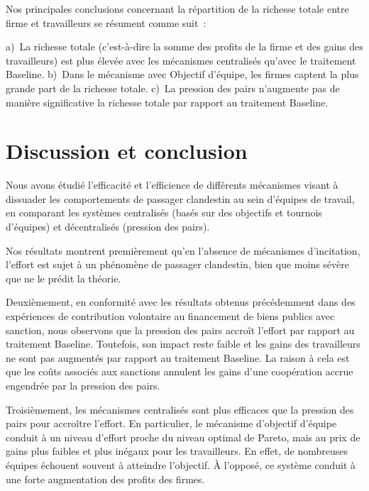\begin{Article}
\begin{refsection}[Lebourges]
Nos principales conclusions concernant la répartition de la richesse
totale entre firme et travailleurs se résument comme suit~:

\vspace{.2cm}
\begin{resultat}
a)~La richesse totale (c'est-à-dire la somme des
profits de la firme et des gains des travailleurs) est plus élevée avec
les mécanismes centralisés qu'avec le traitement Baseline. b)~Dans le
mécanisme avec Objectif d'équipe, les firmes captent la plus grande part
de la richesse totale. c)~La pression des pairs n'augmente pas de
manière significative la richesse totale par rapport au traitement
Baseline.
\end{resultat}


\section{Discussion et conclusion}
\label{section:discussion et conclusion}

Nous avons étudié l'efficacité et l'efficience de différents mécanismes
visant à dissuader les comportements de passager clandestin au sein
d'équipes de travail, en comparant les systèmes centralisés (basés sur
des objectifs et tournois d'équipes) et décentralisés (pression des
pairs).

Nos résultats montrent premièrement qu'en l'absence de mécanismes
d'incitation, l'effort est sujet à un phénomène de passager clandestin,
bien que moins sévère que ne le prédit la théorie.

Deuxièmement, en conformité avec les résultats obtenus précédemment dans
des expériences de contribution volontaire au financement de biens
publics avec sanction, nous observons que la pression des pairs accroît
l'effort par rapport au traitement Baseline. Toutefois, son impact reste
faible et les gains des travailleurs ne sont pas augmentés par rapport
au traitement Baseline. La raison à cela est que les coûts associés aux
sanctions annulent les gains d'une coopération accrue engendrée par la
pression des pairs.

Troisièmement, les mécanismes centralisés sont plus efficaces que la
pression des pairs pour accroître l'effort. En particulier, le mécanisme
d'objectif d'équipe conduit à un niveau d'effort proche du niveau
optimal de Pareto, mais au prix de gains plus faibles et plus inégaux
pour les travailleurs. En effet, de nombreuses équipes échouent souvent
à atteindre l'objectif. À l'opposé, ce système conduit à une forte
augmentation des profits des firmes.


\end{refsection}
\end{Article}
